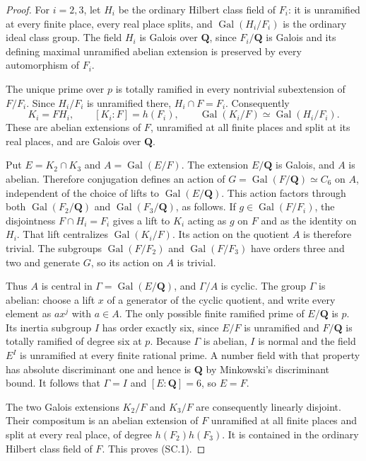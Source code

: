 \documentclass[11pt,a4paper]{article}
\theoremstyle{definition}
\begin{document}
\begin{proof}
For $i=2,3$, let $H_i$ be the ordinary Hilbert class field of $F_i$:
it is unramified at every finite place, every real place splits, and
$\operatorname{Gal}(H_i/F_i)$ is the ordinary ideal class group.
The field $H_i$ is Galois over $\mathbf Q$, since $F_i/\mathbf Q$ is
Galois and its defining maximal unramified abelian extension is
preserved by every automorphism of $F_i$.

The unique prime over $p$ is totally ramified in every nontrivial
subextension of $F/F_i$.  Since $H_i/F_i$ is unramified there,
$H_i\cap F=F_i$.  Consequently
\[
 K_i=FH_i,\qquad [K_i:F]=h(F_i),
 \qquad \operatorname{Gal}(K_i/F)\simeq\operatorname{Gal}(H_i/F_i).
 \tag{SC.2}
\]
These are abelian extensions of $F$, unramified at all finite places
and split at its real places, and are Galois over $\mathbf Q$.

Put $E=K_2\cap K_3$ and $A=\operatorname{Gal}(E/F)$.
The extension $E/\mathbf Q$ is Galois, and $A$ is abelian.  Therefore
conjugation defines an action of
$G=\operatorname{Gal}(F/\mathbf Q)\simeq C_6$ on $A$, independent
of the choice of lifts to $\operatorname{Gal}(E/\mathbf Q)$.
This action factors through both $\operatorname{Gal}(F_2/\mathbf Q)$
and $\operatorname{Gal}(F_3/\mathbf Q)$, as follows.
If $g\in\operatorname{Gal}(F/F_i)$, the disjointness
$F\cap H_i=F_i$ gives a lift to $K_i$ acting as $g$ on $F$ and as
the identity on $H_i$.  That lift centralizes
$\operatorname{Gal}(K_i/F)$.  Its action on the quotient $A$ is
therefore trivial.  The subgroups $\operatorname{Gal}(F/F_2)$ and
$\operatorname{Gal}(F/F_3)$ have orders three and two and generate
$G$, so its action on $A$ is trivial.

Thus $A$ is central in $\Gamma=\operatorname{Gal}(E/\mathbf Q)$,
and $\Gamma/A$ is cyclic.  The group $\Gamma$ is abelian: choose
a lift $x$ of a generator of the cyclic quotient, and write every
element as $ax^j$ with $a\in A$.
The only possible finite ramified prime of $E/\mathbf Q$ is $p$.
Its inertia subgroup $I$ has order exactly six, since $E/F$ is
unramified and $F/\mathbf Q$ is totally ramified of degree six at $p$.
Because $\Gamma$ is abelian, $I$ is normal and the field $E^I$ is
unramified at every finite rational prime.  A number field with that
property has absolute discriminant one and hence is $\mathbf Q$
by Minkowski's discriminant bound.  It follows that $\Gamma=I$ and
$[E:\mathbf Q]=6$, so $E=F$.

The two Galois extensions $K_2/F$ and $K_3/F$ are consequently
linearly disjoint.  Their compositum is an abelian extension of $F$
unramified at all finite places and split at every real place, of
degree $h(F_2)h(F_3)$.  It is contained in the ordinary Hilbert
class field of $F$.  This proves (SC.1).
\end{proof}
\end{document}
